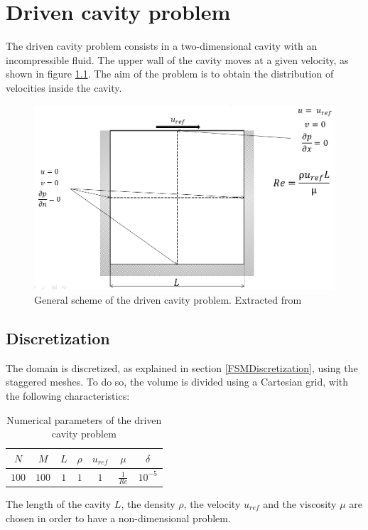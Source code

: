 \chapter{Driven cavity problem}
The driven cavity problem consists in a two-dimensional cavity with an incompressible fluid. The upper wall of the cavity moves at a given velocity, as shown in figure \ref{DrivenCavityImg}. The aim of the problem is to obtain the distribution of velocities inside the cavity.
\begin{figure}[h]
	\centering
	\includegraphics[scale=0.5]{DrivenCavity/DrivenCavity}
	\caption[General scheme of the driven cavity problem]{General scheme of the driven cavity problem. Extracted from \cite{CTTCa}}
	\label{DrivenCavityImg}
\end{figure}

\section{Discretization}
The domain is discretized, as explained in section \ref{FSMDiscretization}, using the staggered meshes. To do so, the volume is divided using a Cartesian grid, with the following characteristics:
\begin{table}[]
	\centering
	\begin{tabular}{ |c|c|c|c|c|c|c| }
		\hline
		$N$ & $M$ & $L$ & $\rho$ & $u_{ref}$ & $\mu$ & $\delta$ \\ \hline
		$100$ & $100$ & $1$ & $1$ & $1$ & $\frac{1}{Re}$ & $10^{-5}$ \\ \hline
	\end{tabular}
\caption{Numerical parameters of the driven cavity problem}
\end{table}

The length of the cavity $L$, the density $\rho$, the velocity $u_{ref}$ and the viscosity $\mu$ are chosen in order to have a non-dimensional problem. 

